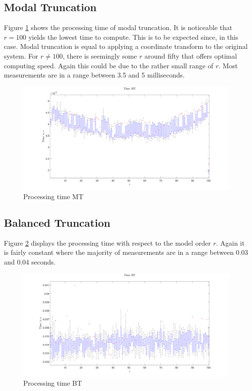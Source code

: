\subsection{Modal Truncation}
Figure \ref{FIG-T-MT} shows the processing time of modal truncation.
It is noticeable that \(r = 100\) yields the lowest time to compute.
This is to be expected since, in this case. Modal truncation is equal to applying a coordinate transform to the original system.
For \(r \neq 100\), there is seemingly some \(r\) around fifty that offers optimal computing speed.
Again this could be due to the rather small range of  \(r\).
Most measurements are in a range between 3.5 and 5 milliseconds.
\begin{figure}[H]
\centering
\includegraphics[width=\textwidth]{images/time/MT}
\caption{Processing time MT}
\label{FIG-T-MT}
\end{figure}


\subsection{Balanced Truncation}
Figure \ref{FIG-T-BT} displays the processing time with respect to the model order \(r\).
Again it is fairly constant where the majority of measurements are in a range between 0.03 and 0.04 seconds.
\begin{figure}[H]
\centering
\includegraphics[width=\textwidth]{images/time/BT}
\caption{Processing time BT}
\label{FIG-T-BT}
\end{figure}


